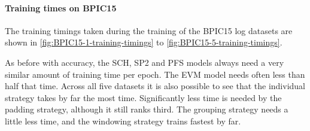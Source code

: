 \paragraph{Training times on BPIC15}
The training timings taken during the training of the BPIC15 log datasets are shown in \autoref{fig:BPIC15-1-training-timings} to \autoref{fig:BPIC15-5-training-timings}.

As before with accuracy, the SCH, SP2 and PFS models always need a very similar amount of training time per epoch.
The EVM model needs often less than half that time.
Across all five datasets it is also possible to see that the individual strategy takes by far the most time.
Significantly less time is needed by the padding strategy, although it still ranks third.
The grouping strategy needs a little less time, and the windowing strategy trains fastest by far.

